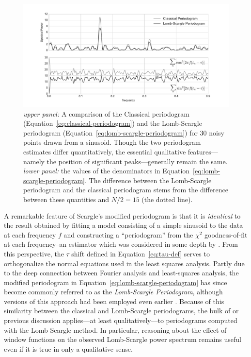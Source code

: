 \documentclass[preprint]{aastex}
\newcommand{\figlabel}[1]{\label{fig:#1}}
\newcommand{\Eq}[1]{Equation~\ref{eq:#1}}
\newcommand{\eq}[1]{\Eq{#1}}
\begin{document}
\begin{figure}[ht]
  \centering
  \includegraphics[width=\textwidth]{fig17_ls_comparison}
  \caption{{\it upper panel:} A comparison of the Classical periodogram
    (\eq{classical-periodogram}) and the Lomb-Scargle periodogram
    (\eq{lomb-scargle-periodogram}) for 30 noisy points drawn from a sinusoid.
    Though the two periodogram estimates differ quantitatively, the essential
    qualitative features---namely the position of significant peaks---generally
    remain the same.
    {\it lower panel:} the values of the denominators in
    \eq{lomb-scargle-periodogram}.
    The difference between the Lomb-Scargle periodogram and the classical
    periodogram stems from the difference between these quantities
    and $N/2 = 15$ (the dotted line).
    \figlabel{ls-comparison}}
\end{figure}

A remarkable feature of Scargle's modified periodogram is that it is
{\it identical} to the result
obtained by fitting a model consisting of a simple sinusoid to the data at
each frequency $f$ and
constructing a ``periodogram'' from the $\chi^2$ goodness-of-fit at each
frequency--an estimator which was considered in some depth by \citet{Lomb76}.
From this perspective, the $\tau$ shift defined in \eq{tau-def} serves to
orthogonalize the normal equations used in the least squares analysis.
Partly due to the deep connection between Fourier analysis and least-squares
analysis, the modified periodogram in \eq{lomb-scargle-periodogram}
has since become commonly referred to as the {\it Lomb-Scargle Periodogram},
although versions of this approach had been employed even earlier
\citep[see, e.g.][]{Gottlieb75}.
Because of this similarity between the classical and Lomb-Scargle periodograms,
the bulk of or previous discussion applies---at least qualitatively---to
periodograms computed with the Lomb-Scargle method.
In particular, reasoning about the effect of window functions on the observed
Lomb-Scargle power spectrum remains useful even if it is true in only a
qualitative sense.
\end{document}
